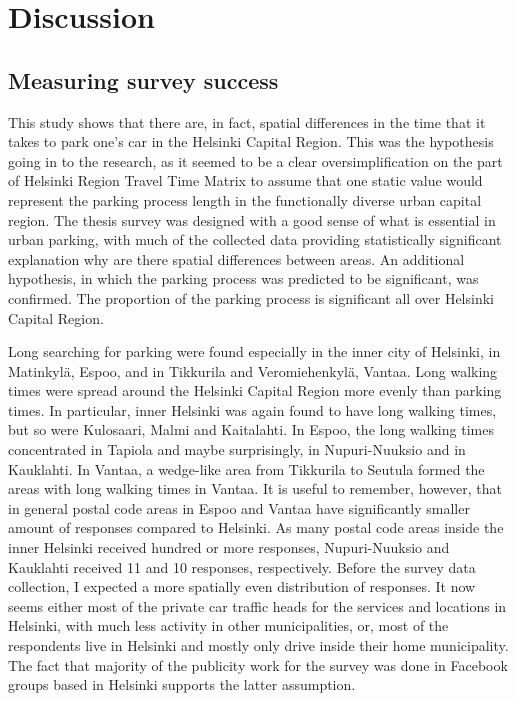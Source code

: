 \section{Discussion}
\subsection{Measuring survey success}
\justify

This study shows that there are, in fact, spatial differences in the time that it takes to park one's car in the Helsinki Capital Region. This was the hypothesis going in to the research, as it seemed to be a clear oversimplification on the part of Helsinki Region Travel Time Matrix to assume that one static value would represent the parking process length in the functionally diverse urban capital region. The thesis survey was designed with a good sense of what is essential in urban parking, with much of the collected data providing statistically significant explanation why are there spatial differences between areas. An additional hypothesis, in which the parking process was predicted to be significant, was confirmed. The proportion of the parking process is significant all over Helsinki Capital Region.

Long searching for parking were found especially in the inner city of Helsinki, in Matinkylä, Espoo, and in Tikkurila and Veromiehenkylä, Vantaa. Long walking times were spread around the Helsinki Capital Region more evenly than parking times. In particular, inner Helsinki was again found to have long walking times, but so were Kulosaari, Malmi and Kaitalahti. In Espoo, the long walking times concentrated in Tapiola and maybe surprisingly, in Nupuri-Nuuksio and in Kauklahti. In Vantaa, a wedge-like area from Tikkurila to Seutula formed the areas with long walking times in Vantaa. It is useful to remember, however, that in general postal code areas in Espoo and Vantaa have significantly smaller amount of responses compared to Helsinki. As many postal code areas inside the inner Helsinki received hundred or more responses, Nupuri-Nuuksio and Kauklahti received 11 and 10 responses, respectively. Before the survey data collection, I expected a more spatially even distribution of responses. It now seems either most of the private car traffic heads for the services and locations in Helsinki, with much less activity in other municipalities, or, most of the respondents live in Helsinki and mostly only drive inside their home municipality. The fact that majority of the publicity work for the survey was done in Facebook groups based in Helsinki supports the latter assumption.

